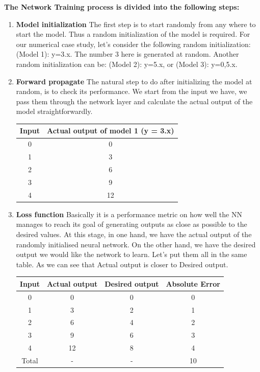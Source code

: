 \vspace{40mm}
\textbf{The Network Training process is divided into the following steps:}
\begin{enumerate}
    \item \textbf{Model initialization} \newline
        The first step is to start randomly from any where to start the model. Thus a random initialization of the model is required. \newline 
        For our numerical case study, let’s consider the following random initialization: (Model 1): y=3.x. The number 3 here is generated at random. Another random initialization can be: (Model 2): y=5.x, or (Model 3): y=0,5.x.
         
    \item \textbf{Forward propagate} \newline
    The natural step to do after initializing the model at random, is to check its performance. We start from the input we have, we pass them through the network layer and calculate the actual output of the model straightforwardly.

\begin{table}[h!]
\centering
 \begin{tabular}{|c|c|} 
 \hline
 Input & Actual output of model 1 (y = 3.x) \\ [0.5ex] 
 \hline\hline
 0 & 0 \\ 
 1 & 3 \\
 2 & 6 \\
 3 & 9 \\
 4 & 12 \\ [1ex] 
 \hline
 \end{tabular}
\end{table}



    \item \textbf{Loss function} \newline
    Basically it is a performance metric on how well the NN manages to reach its goal of generating outputs as close as possible to the desired values.
    At this stage, in one hand, we have the actual output of the randomly initialised neural network.
    On the other hand, we have the desired output we would like the network to learn.
    Let’s put them all in the same table.\newline
    As we can see that Actual output is closer to Desired output.
   
\begin{table}[h!]
\centering
 \begin{tabular}{|c|c|c|c|} 
 \hline
 Input & Actual output & Desired output & Absolute Error \\ [0.5ex] 
 \hline\hline
 0 & 0 & 0 & 0\\ 
 1 & 3 & 2 & 1\\
 2 & 6 & 4 & 2\\
 3 & 9 & 6 & 3\\
 4 & 12 & 8 & 4\\ 
 Total & - & - & 10\\ [1ex] 
 \hline
 \end{tabular}
\end{table}



\end{enumerate}
